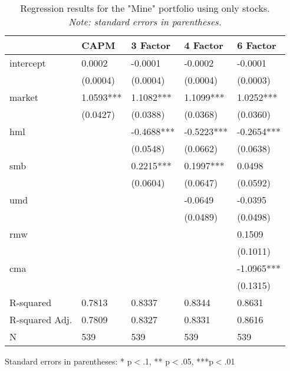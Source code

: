 \begin{appendices}
\begin{table}
\caption{Regression results for the "Mine" portfolio using only stocks. \\ \textit{Note: standard errors in parentheses.}}
\label{tab:mine_stock}
\begin{center}
\begin{tabular}{lllll}
\hline
               & CAPM      & 3 Factor   & 4 Factor   & 6 Factor    \\
\hline
intercept          & 0.0002    & -0.0001    & -0.0002    & -0.0001     \\
               & (0.0004)  & (0.0004)   & (0.0004)   & (0.0003)    \\
market           & 1.0593*** & 1.1082***  & 1.1099***  & 1.0252***   \\
               & (0.0427)  & (0.0388)   & (0.0368)   & (0.0360)    \\
hml            &           & -0.4688*** & -0.5223*** & -0.2654***  \\
               &           & (0.0548)   & (0.0662)   & (0.0638)    \\
smb            &           & 0.2215***  & 0.1997***  & 0.0498      \\
               &           & (0.0604)   & (0.0647)   & (0.0592)    \\
umd            &           &            & -0.0649    & -0.0395     \\
               &           &            & (0.0489)   & (0.0498)    \\
rmw            &           &            &            & 0.1509      \\
               &           &            &            & (0.1011)    \\
cma            &           &            &            & -1.0965***  \\
               &           &            &            & (0.1315)    \\
R-squared      & 0.7813    & 0.8337     & 0.8344     & 0.8631      \\
R-squared Adj. & 0.7809    & 0.8327     & 0.8331     & 0.8616      \\
N              & 539       & 539        & 539        & 539         \\
\hline
\end{tabular}
\end{center}
{\footnotesize Standard errors in parentheses: * p$<$.1, ** p$<$.05, ***p$<$.01\par}
\end{table}


\end{appendices}
